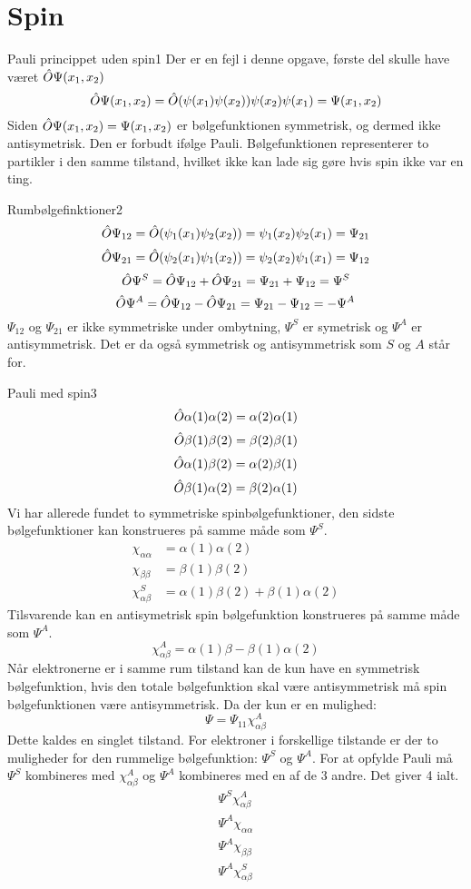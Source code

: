\section*{Spin}
\begin{opgave}{Pauli princippet uden spin}{1}
Der er en fejl i denne opgave, første del skulle have været $\hat O\Psi(x_1,x_2)$
\opg 
$$
\hat O\Psi(x_1,x_2) = \hat O(\psi(x_1)\psi(x_2))\psi(x_2)\psi(x_1) = \Psi(x_1,x_2)
$$
\opg Siden $\hat O\Psi(x_1,x_2)=\Psi(x_1,x_2)
$
er bølgefunktionen symmetrisk, og dermed ikke antisymetrisk. Den er forbudt ifølge Pauli. Bølgefunktionen representerer to partikler i den samme tilstand, hvilket ikke kan lade sig gøre hvis spin ikke var en ting.
\end{opgave}
%
\begin{opgave}{Rumbølgefinktioner}{2}
\opg
$$
\hat O \Psi_{12}=\hat O(\psi_1(x_1)\psi_2(x_2))=\psi_1(x_2)\psi_2(x_1)=\Psi_{21}
$$
\opg
$$
\hat O \Psi_{21}=\hat O(\psi_2(x_1)\psi_1(x_2))=\psi_2(x_2)\psi_1(x_1)=\Psi_{12}
$$
\opg
$$
\hat O \Psi^S=\hat O\Psi_{12}+\hat O\Psi_{21}=\Psi_{21}+\Psi_{12}=\Psi^S
$$
\opg
$$
\hat O \Psi^A=\hat O\Psi_{12}-\hat O\Psi_{21}=\Psi_{21}-\Psi_{12}=-\Psi^A
$$
\opg $\Psi_{12}$ og $\Psi_{21}$ er ikke symmetriske under ombytning, $\Psi^S$ er symetrisk og $\Psi^A$ er  antisymmetrisk. Det er da også symmetrisk og antisymmetrisk som $S$ og $A$ står for.
\end{opgave}
%
\begin{opgave}{Pauli med spin}{3}
\opg
$$
\hat O\alpha(1)\alpha(2) = \alpha(2)\alpha(1)
$$
\opg
$$
\hat O \beta(1)\beta(2) = \beta(2)\beta(1)
$$
\opg
$$
\hat O \alpha(1)\beta(2) = \alpha(2)\beta(1)
$$
\opg
$$
\hat O \beta(1)\alpha(2) = \beta(2)\alpha(1)
$$
\opg Vi har allerede fundet to symmetriske spinbølgefunktioner, den sidste bølgefunktioner kan konstrueres på samme måde som $\Psi^S$.
\begin{align*}
\chi_{\alpha\alpha}&=\alpha(1)\alpha(2)\\
\chi_{\beta\beta}&=\beta(1)\beta(2)\\
\chi_{\alpha\beta}^S&=\alpha(1)\beta(2)+\beta(1)\alpha(2)
\end{align*} 
\opg Tilsvarende kan en antisymetrisk spin bølgefunktion konstrueres på samme måde som $\Psi^A$.
$$
\chi_{\alpha\beta}^A=\alpha(1)\beta-\beta(1)\alpha(2)
$$
\opg Når elektronerne er i samme rum tilstand kan de kun have en symmetrisk bølgefunktion, hvis den totale bølgefunktion skal være antisymmetrisk må spin bølgefunktionen være antisymmetrisk.
Da der kun er en mulighed:
\opg
$$
\Psi=\Psi_{11}\chi_{\alpha\beta}^A
$$
Dette kaldes en singlet tilstand.
\opg For elektroner i forskellige tilstande er der to muligheder for den rummelige bølgefunktion: $\Psi^S$ og $\Psi^A$. For at opfylde Pauli må $\Psi^S$ kombineres med $\chi_{\alpha\beta}^A$ og $\Psi^A$ kombineres med en af de 3 andre.
Det giver 4 ialt.
\begin{align*}
\Psi^S\chi_{\alpha\beta}^A\\
\Psi^A\chi_{\alpha\alpha}\\
\Psi^A\chi_{\beta\beta}\\
\Psi^A\chi_{\alpha\beta}^S
\end{align*}
\end{opgave}